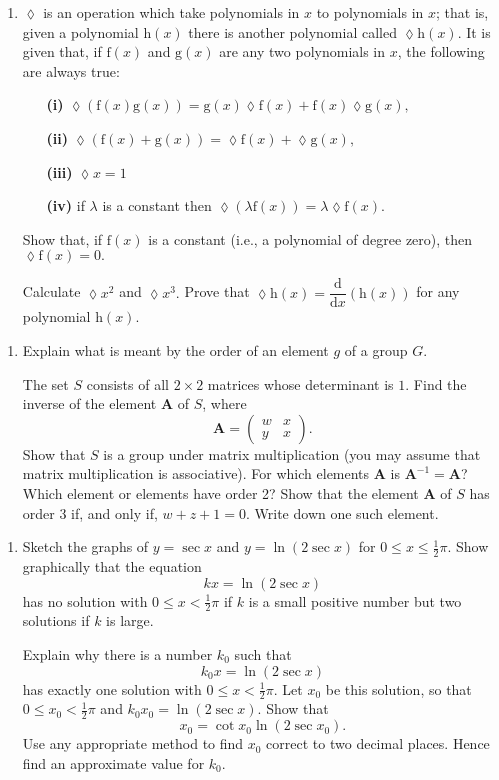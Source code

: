 \documentclass[a4, 11pt]{report}
\newlength{\qspace}
\newcounter{qnumber}
\newenvironment{question}%
 {\vspace{\qspace}
  \begin{enumerate}[\bfseries 1\quad][10]%
    \setcounter{enumi}{\value{qnumber}}%
    \item%
 }
{
  \end{enumerate}
  \filbreak
  \stepcounter{qnumber}
 }
\begin{document}
\begin{question}
$\lozenge$ is an operation which take polynomials in $x$ to polynomials
in $x$; that is, given a polynomial $\mathrm{h}(x)$ there is another
polynomial called $\lozenge\mathrm{h}(x)$. It is given that, if $\mathrm{f}(x)$
and $\mathrm{g}(x)$ are any two polynomials in $x$, the following
are always true: 
\begin{itemize}
\setlength{\itemsep}{3mm}
\item[\bf (i)] $\lozenge(\mathrm{f}(x)\mathrm{g}(x))=\mathrm{g}(x)\lozenge\mathrm{f}(x)+\mathrm{f}(x)\lozenge\mathrm{g}(x),$ 
\item[\bf (ii)] $\lozenge(\mathrm{f}(x)+\mathrm{g}(x))=\lozenge\mathrm{f}(x)+\lozenge\mathrm{g}(x),$ 
\item[\bf (iii)] $\lozenge x=1$
\item[\bf (iv)] if $\lambda$ is a constant then $\lozenge(\lambda\mathrm{f}(x))=\lambda\lozenge\mathrm{f}(x).$

\end{itemize}

Show that, if $\mathrm{f}(x)$ is a constant (i.e., a polynomial of
degree zero), then $\lozenge\mathrm{f}(x)=0.$ 

Calculate $\lozenge x^{2}$ and $\lozenge x^{3}.$ Prove that $\lozenge\mathrm{h}(x)=\dfrac{\mathrm{d}}{\mathrm{d}x}(\mathrm{h}(x))$
for any polynomial $\mathrm{h}(x)$. 
	\end{question}

\begin{question}
	Explain what is meant by the order of an element $g$ of a group $G$. 


	The set $S$ consists of all $2\times2$ matrices whose determinant
	is $1$. Find the inverse of the element $\mathbf{A}$ of $S$, where
	\[
	\mathbf{A}=\begin{pmatrix}w & x\\
	y & x
	\end{pmatrix}.
	\]
	Show that $S$ is a group under matrix multiplication (you may assume
	that matrix multiplication is associative). For which elements $\mathbf{A}$
	is $\mathbf{A}^{-1}=\mathbf{A}$? Which element or elements have order
	2? Show that the element $\mathbf{A}$ of $S$ has order 3 if, and
	only if, $w+z+1=0.$ Write down one such element.
	\end{question}
	
	\begin{question}
Sketch the graphs of $y=\sec x$ and $y=\ln(2\sec x)$ for $0\leqslant x\leqslant\frac{1}{2}\pi$.
Show graphically that the equation 
\[
kx=\ln(2\sec x)
\]
has no solution with $0\leqslant x<\frac{1}{2}\pi$ if $k$ is a small
positive number but two solutions if $k$ is large. 


Explain why there is a number $k_{0}$ such that 
\[
k_{0}x=\ln(2\sec x)
\]
has exactly one solution with $0\leqslant x<\frac{1}{2}\pi$. Let
$x_{0}$ be this solution, so that $0\leqslant x_{0}<\frac{1}{2}\pi$
and $k_{0}x_{0}=\ln(2\sec x)$. Show that 
\[
x_{0}=\cot x_{0}\ln(2\sec x_{0}).
\]
Use any appropriate method to find $x_{0}$ correct to two decimal
places. Hence find an approximate value for $k_{0}$. 
	\end{question}
	
\end{document}
